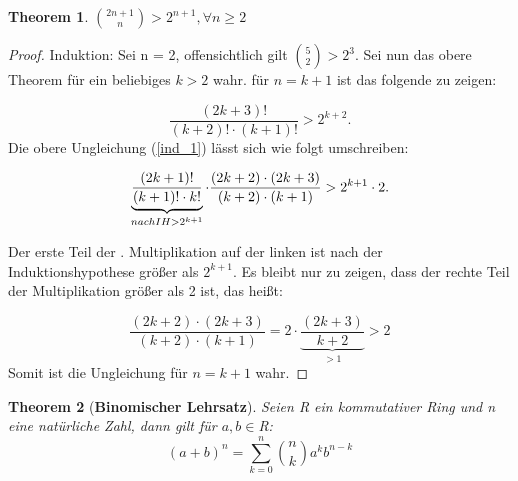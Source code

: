 \documentclass[12pt,oneside]{article}
\newtheorem{theorem}{Theorem}[section]
\theoremstyle{remark}
\theoremstyle{definition}
\begin{document}
\smallskip
\begin{flushleft}
\begin{theorem}
${2n + 1 \choose n} > 2^{n+1}, \forall n \geq 2$
\end{theorem}

\begin{proof}
Induktion: Sei n = 2, offensichtlich gilt ${5 \choose 2} > 2^3$. Sei nun das obere Theorem für ein beliebiges $k > 2 $ wahr.\newline\newline
für $n = k + 1$ ist das folgende zu zeigen: 

\begin{equation}\label{ind_1}
    \frac{(2k + 3)!}{(k + 2)!\cdot(k + 1)!} > 2^{k+2}.
\end{equation}
\newline\newline
Die obere Ungleichung (\ref{ind_1}) lässt sich wie folgt umschreiben:\newline\newline


\begin{equation}
     \underbrace{\frac{(2k + 1)!}{(k + 1)! \cdot k!}}_{nach IH > 2^{k + 1}} \cdot \frac{(2k + 2) \cdot (2k + 3)}{(k + 2) \cdot (k + 1)} > 2^{k+1} \cdot 2.\newline\newline
\end{equation}

Der erste Teil der . Multiplikation auf der linken ist nach der Induktionshypothese größer als $2^{k+1}$. Es bleibt nur zu zeigen, dass der rechte Teil der Multiplikation größer als 2 ist, das heißt: \newline\newline

\begin{equation}\label{ind_eq}
\frac{(2k + 2) \cdot (2k + 3)}{(k + 2) \cdot (k + 1)} = 2 \cdot \underbrace{\frac{(2k + 3 )}{k + 2}}_{ > 1} > 2
\end{equation}
Somit ist die Ungleichung für $n = k + 1$ wahr.
\end{proof}

\end{flushleft}
\smallskip 

\begin{theorem}[\textbf{Binomischer Lehrsatz}]\label{Th_3}
Seien R ein kommutativer Ring und n eine natürliche Zahl, dann gilt für $a,b \in $R:\newline\newline
 \begin{equation}
     (a + b)^n  = \sum_{k=0}^n {n \choose k} a^k b^{n-k}
 \end{equation}
\end{theorem}
\end{document}
